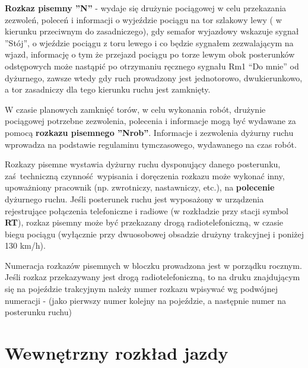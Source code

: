 \textbf{Rozkaz pisemny ''N'' } - wydaje się drużynie pociągowej w celu przekazania zezwoleń, poleceń i informacji o wyjeździe pociągu na tor szlakowy lewy ( w kierunku przeciwnym do zasadniczego), gdy semafor wyjazdowy wskazuje sygnał ''Stój'', o wjeździe pociągu z toru lewego i co będzie sygnałem zezwalającym na wjazd, informację o tym że przejazd pociągu po torze lewym obok posterunków odstępowych może nastąpić po otrzymaniu ręcznego sygnału Rm1 “Do mnie” od dyżurnego, zawsze wtedy gdy ruch prowadzony jest jednotorowo, dwukierunkowo, a tor zasadniczy dla tego kierunku ruchu  jest zamknięty.

W czasie planowych zamknięć torów, w celu wykonania robót, drużynie pociągowej potrzebne zezwolenia, polecenia i informacje mogą być wydawane za pomocą \textbf{rozkazu pisemnego ''Nrob''}. Informacje i zezwolenia dyżurny ruchu wprowadza na podstawie regulaminu tymczasowego, wydawanego na czas robót.

Rozkazy pisemne wystawia dyżurny ruchu dysponujący danego posterunku, zaś techniczną czynność wypisania i doręczenia rozkazu może wykonać inny, upoważniony pracownik (np. zwrotniczy, nastawniczy, etc.), na \textbf{polecenie} dyżurnego ruchu. Jeśli posterunek ruchu jest wyposażony w urządzenia rejestrujące połączenia telefoniczne i radiowe (w rozkładzie przy stacji symbol \textbf{RT}), rozkaz pisemny może być przekazany drogą radiotelefoniczną, w czasie biegu pociągu (wyłącznie przy dwuosobowej obsadzie drużyny trakcyjnej i poniżej 130 km/h).

Numeracja rozkazów pisemnych w bloczku prowadzona jest w porządku rocznym. Jeśli rozkaz przekazywany jest drogą radiotelefoniczną, to na druku znajdującym się na pojeździe trakcyjnym należy numer rozkazu wpisywać wg podwójnej numeracji - (jako pierwszy numer kolejny na pojeździe, a następnie numer na posterunku ruchu)

\chapter{Wewnętrzny rozkład jazdy}

